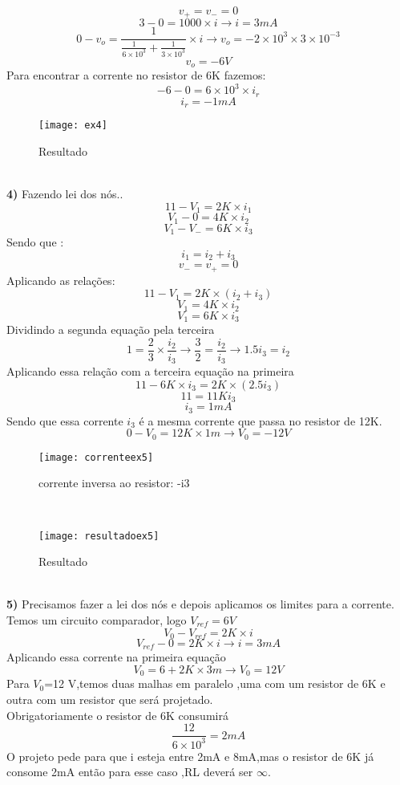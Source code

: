 \documentclass[11pt,a4paper]{article}
\begin{document}
$$v_+=v_-=0$$
$$3-0=1000\times i\rightarrow i=3mA$$
$$0-v_o=\frac{1}{\frac{1}{6\times 10^3}+\frac{1}{3\times 10^3}}\times i\rightarrow v_o=-2\times 10^3 \times 3\times 10^{-3}$$
$$v_o=-6V$$
Para encontrar a corrente no resistor de 6K fazemos:
$$-6-0=6\times 10^3 \times i_r$$
$$i_r=-1mA$$
\begin{figure}[!h]
\begin{center}
\texttt{[image: ex4]}
\caption{Resultado}
\end{center}
\end{figure}
\\
\newpage
\textbf{4) }
Fazendo lei dos nós..\\
$$11-V_1=2K \times i_1$$
$$V_1-0=4K \times i_2$$
$$V_1-V_-=6K \times i_3$$
Sendo que :
$$i_1=i_2+i_3$$
$$v_-=v_+=0$$
Aplicando as relações:
$$11-V_1=2K \times (i_2 +i_3)$$
$$V_1=4K \times i_2$$
$$V_1=6K\times i_3$$
Dividindo a segunda equação pela terceira
$$1=\frac{2}{3}\times \frac{i_2}{i_3}\rightarrow \frac{3}{2}=\frac{i_2}{i_3}\rightarrow 1.5i_3=i_2$$
Aplicando essa relação com a terceira equação na primeira 
$$11-6K\times i_3=2K\times(2.5i_3)$$
$$11=11Ki_3$$
$$i_3=1mA$$
Sendo que essa corrente $i_3$ é a mesma corrente que passa no resistor de 12K.\\
$$0-V_0=12K \times 1m\rightarrow V_0=-12 V$$
\begin{figure}[!h]
\begin{center}
\texttt{[image: correnteex5]}
\caption{corrente inversa ao resistor: -i3}
\end{center}
\end{figure}
\\
\begin{figure}[!h]
\begin{center}
\texttt{[image: resultadoex5]}
\caption{Resultado}
\end{center}
\end{figure}
\\
\newpage
\textbf{5) }
Precisamos fazer a lei dos nós e depois aplicamos os limites para a corrente.\\
Temos um circuito comparador, logo $V_{ref}=6V$
$$V_0-V_{ref}=2K\times i$$
$$V_{ref}-0=2K\times i\rightarrow i=3mA$$
Aplicando essa corrente na primeira equação
$$V_0=6+2K\times 3m\rightarrow V_0=12 V$$
Para $V_0$=12 V,temos duas malhas em paralelo ,uma com um resistor de 6K e outra com um resistor que será projetado.\\
Obrigatoriamente o resistor de 6K consumirá
$$\frac{12}{6\times 10^3}=2mA$$
O projeto pede para que i esteja entre 2mA e 8mA,mas o resistor de 6K já consome 2mA então para esse caso ,RL deverá ser $\infty$.\\
\end{document}
